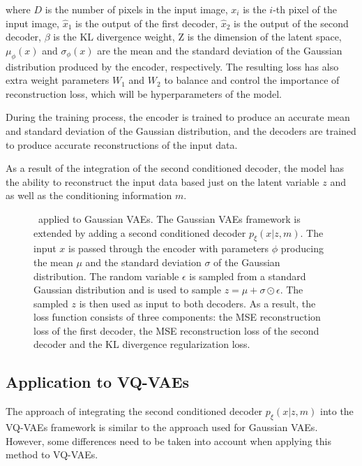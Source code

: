 where $D$ is the number of pixels in the input image, $x_i$ is the $i$-th pixel
of the input image, $\hat{x}_1$ is the output of the first decoder, $\hat{x}_2$
is the output of the second decoder, $\beta$ is the KL divergence weight, Z is
the dimension of the latent space, $\mu_\phi(x)$ and $\sigma_\phi(x)$ are the
mean and the standard deviation of the Gaussian distribution produced by the
encoder, respectively. The resulting loss has also extra weight parameters $W_1$ and $W_2$ to balance and control the importance of reconstruction loss, which will be hyperparameters of the model.

During the training process, the encoder is trained to produce an accurate mean
and standard deviation of the Gaussian distribution, and the decoders are
trained to produce accurate reconstructions of the input data.

As a result of the integration of the second conditioned decoder, the model has
the ability to reconstruct the input data based just on the latent variable $z$
and as well as the conditioning information $m$.
\begin{figure}[H]
    \centering
    
    \caption[ applied to Gaussian VAEs.]%
    {
        \methodOne\ applied to Gaussian VAEs. The Gaussian VAEs framework is extended by adding a second conditioned decoder $p_\xi(x|z,m)$. The input $x$ is passed through the encoder with parameters $\phi$ producing the mean $\mu$ and the standard deviation $\sigma$ of the Gaussian distribution. The random variable $\epsilon$ is sampled from a standard Gaussian distribution and is used to sample $ z = \mu + \sigma \odot \epsilon$. The sampled $z$ is then used as input to both decoders. As a result, the loss function consists of three components: the MSE reconstruction loss of the first decoder, the MSE reconstruction loss of the second decoder and the KL divergence regularization loss.
    }\label{SCVAE2DFigure}
\end{figure}

\subsection{Application to VQ-VAEs}

The approach of integrating the second conditioned decoder $p_\xi(x|z,m)$ into
the VQ-VAEs framework is similar to the approach used for Gaussian VAEs.
However, some differences need to be taken into account when applying
this method to VQ-VAEs.

